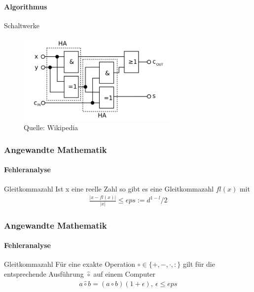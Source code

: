 \documentclass{beamer}
\begin{document}
 \begin{frame}
    \framesubtitle{Algorithmus}
        \begin{block}{Schaltwerke}
    \begin{figure}[H]
          \centering
        \includegraphics[width=0.7\textwidth]{images/Volladdierer}
          \caption{Quelle: Wikipedia}
    \end{figure}
    \end{block}
    
     \end{frame}
    

\begin{frame}
    \frametitle{Angewandte Mathematik}
\framesubtitle{Fehleranalyse}
    \begin{block}{Gleitkommazahl}
Ist x eine reelle Zahl so gibt es eine  Gleitkommazahl $fl(x)$ mit
\begin{align*}
\frac{|x-fl(x)| }{|x|} \leq eps := d^{1-l}/2
\end{align*}
\end{block}

 \end{frame}



\begin{frame}
    \frametitle{Angewandte Mathematik}
\framesubtitle{Fehleranalyse}
    \begin{block}{Gleitkommazahl}
Für eine exakte Operation $\circ \in \{+,-, \cdot, : \}$ gilt für die entsprechende Ausführung $\hat{\circ}$ auf einem Computer
\begin{align*}
a \hat{\circ}  b = (a \circ b) (1  + \epsilon) , \ \epsilon \leq eps 
\end{align*}
\end{block}
 \end{frame}
\end{document}
